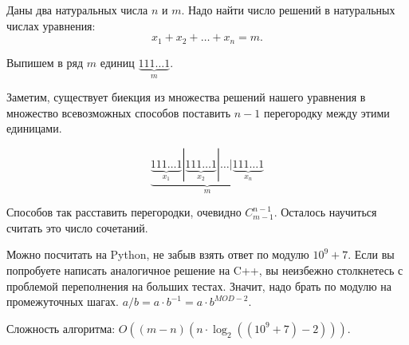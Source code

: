 \solutionSection

Даны два натуральных числа $n$ и $m$. Надо найти число решений в натуральных числах уравнения:
$$x_1 + x_2 + \dots + x_n = m.$$

Выпишем в ряд $m$ единиц $\underbrace{111\dots 1}_m$.

Заметим, существует биекция из множества решений нашего уравнения в множество всевозможных способов поставить $n-1$ перегородку между этими единицами.

$$\underbrace{\underbrace{111\dots 1}_{x_1}|\underbrace{111\dots 1}_{x_2}|\dots|\underbrace{111\dots 1}_{x_n}}_m$$

Способов так расставить перегородки, очевидно $C_{m-1}^{n-1}$. Осталось научиться считать это число сочетаний.

Можно посчитать на Python, не забыв взять ответ по модулю $10^9+7$. Если вы попробуете написать аналогичное решение на C++, вы неизбежно столкнетесь с проблемой переполнения на больших тестах. Значит, надо брать по модулю на промежуточных шагах. $a/b = a\cdot b^{-1} = a\cdot b ^ {MOD - 2}$.

Сложность алгоритма: $O((m-n)(n\cdot\log_2{((10^9+7)-2)}))$.

\codeExample

